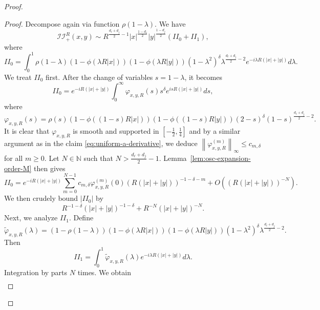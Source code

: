 \documentclass[12pt]{amsart}
\begin{document}
\begin{proof}
\begin{proof}
Decompose again via function $\rho(1-\lambda)$. We have
\begin{equation*}
    \mathcal{II}_+^R(x,y) \sim R^{\frac{d_\ell+d_j}{2}-1}
|x|^{\frac{1-d_\ell}{2}}|y|^{\frac{1-d_j}{2}} \left( II_0 + II_1 \right),
\end{equation*}
where
\begin{equation*}
    II_0 = \int_0^1 \rho(1-\lambda)
(1-\phi(\lambda R|x|))(1-\phi(\lambda R|y|))(1-\lambda^2)^\delta
\lambda^{\frac{d_\ell+d_j}{2}-2}
e^{-i\lambda R(|x|+|y|)} d\lambda.
\end{equation*}
We treat $II_0$ first. After the change of variables $s=1-\lambda$, it becomes
\begin{equation*}
    II_0 = e^{-iR(|x|+|y|)} \int_0^\infty \varphi_{x,y,R}(s) s^\delta e^{isR(|x|+|y|)} ds,
\end{equation*}
where
\begin{equation*}
    \varphi_{x,y,R}(s)
=
\rho(s) (1-\phi((1-s)R|x|))(1-\phi((1-s)R|y|))(2-s)^\delta(1-s)^{\frac{d_\ell+d_j}{2}-2}.
\end{equation*}
It is clear that $\varphi_{x,y,R}$ is smooth and supported in $[-\frac{1}{2},\frac{1}{4}]$ and by a similar argument as in the claim \eqref{eq:uniform-a-derivative}, we deduce $\left\| \varphi_{x,y,R}^{(m)}  \right\|_\infty \le c_{m,\delta}$ for all $m\ge 0$. Let $N \in \mathbb{N}$ such that $N>\frac{d_\ell+d_j}{2}-1$. Lemma~\ref{lem:osc-expansion-order-M} then gives 
\begin{equation*}
    II_0 = e^{-iR(|x|+|y|)} \sum_{m=0}^{N-1} c_{m,\delta} \varphi_{x,y,R}^{(m)}(0) \left(R(|x|+|y|)\right)^{-1-\delta-m} + O\left(\left(R(|x|+|y|)\right)^{-N}\right).
\end{equation*}
We then crudely bound $|II_0|$ by
\begin{equation}\label{II_0_crude}
    R^{-1-\delta}(|x|+|y|)^{-1-\delta} + R^{-N}(|x|+|y|)^{-N}.
\end{equation}
Next, we analyze $II_1$. Define
\begin{equation*}
    \widetilde{\varphi}_{x,y,R}(\lambda) = \left(1-\rho(1-\lambda)\right)
(1-\phi(\lambda R|x|))(1-\phi(\lambda R|y|))(1-\lambda^2)^\delta
\lambda^{\frac{d_\ell+d_j}{2}-2}.
\end{equation*}
Then 
\begin{equation*}
    II_1 = \int_0^1 \widetilde{\varphi}_{x,y,R}(\lambda) e^{-i\lambda R(|x|+|y|)} d\lambda.
\end{equation*}
Integration by parts $N$ times. We obtain
\begin{align*}

\end{align*}
\end{proof}
\end{proof}
\end{document}
